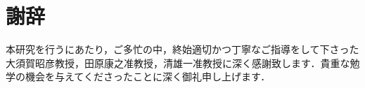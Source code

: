 \chapter*{謝辞}
本研究を行うにあたり，ご多忙の中，終始適切かつ丁寧なご指導をして下さった大須賀昭彦教授，田原康之准教授，清雄一准教授に深く感謝致します．貴重な勉学の機会を与えてくださったことに深く御礼申し上げます．






